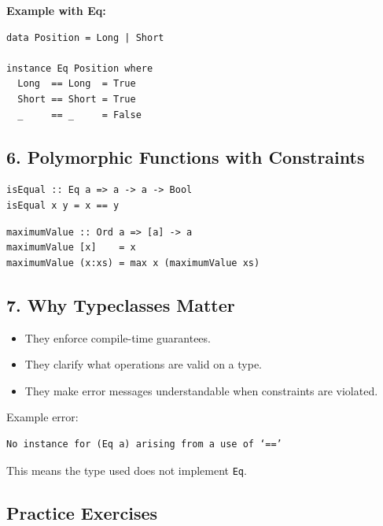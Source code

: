 \documentclass[12pt]{article}
\begin{document}
\textbf{Example with Eq:}
\begin{verbatim}
data Position = Long | Short

instance Eq Position where
  Long  == Long  = True
  Short == Short = True
  _     == _     = False
\end{verbatim}

\subsection{6. Polymorphic Functions with Constraints}

\begin{verbatim}
isEqual :: Eq a => a -> a -> Bool
isEqual x y = x == y
\end{verbatim}

\begin{verbatim}
maximumValue :: Ord a => [a] -> a
maximumValue [x]    = x
maximumValue (x:xs) = max x (maximumValue xs)
\end{verbatim}

\subsection{7. Why Typeclasses Matter}

\begin{itemize}
  \item They enforce compile-time guarantees.
  \item They clarify what operations are valid on a type.
  \item They make error messages understandable when constraints are violated.
\end{itemize}

Example error:

\begin{verbatim}
No instance for (Eq a) arising from a use of ‘==’
\end{verbatim}

This means the type used does not implement \texttt{Eq}.

\subsection{Practice Exercises}
\end{document}
